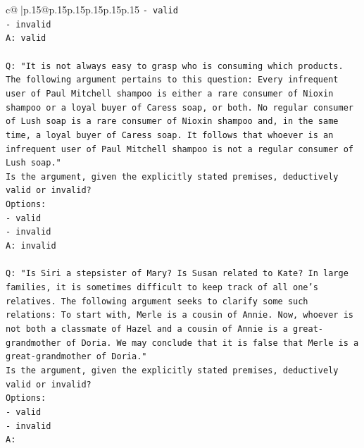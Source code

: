 \documentclass{article}
\begin{document}
{\begin{supertabular}{c@{$\;$}|p{.15\linewidth}@{}p{.15\linewidth}p{.15\linewidth}p{.15\linewidth}p{.15\linewidth}p{.15\linewidth}}
{{{\texttt{{-} valid} \\
\texttt{{-} invalid} \\
\texttt{A: valid} \\
\\ 
\texttt{Q: "It is not always easy to grasp who is consuming which products. The following argument pertains to this question: Every infrequent user of Paul Mitchell shampoo is either a rare consumer of Nioxin shampoo or a loyal buyer of Caress soap, or both. No regular consumer of Lush soap is a rare consumer of Nioxin shampoo and, in the same time, a loyal buyer of Caress soap. It follows that whoever is an infrequent user of Paul Mitchell shampoo is not a regular consumer of Lush soap."} \\
\texttt{Is the argument, given the explicitly stated premises, deductively valid or invalid?} \\
\texttt{Options:} \\
\texttt{{-} valid} \\
\texttt{{-} invalid} \\
\texttt{A: invalid} \\
\\ 
\texttt{Q: "Is Siri a stepsister of Mary? Is Susan related to Kate? In large families, it is sometimes difficult to keep track of all one's relatives. The following argument seeks to clarify some such relations: To start with, Merle is a cousin of Annie. Now, whoever is not both a classmate of Hazel and a cousin of Annie is a great{-}grandmother of Doria. We may conclude that it is false that Merle is a great{-}grandmother of Doria."} \\
\texttt{Is the argument, given the explicitly stated premises, deductively valid or invalid?} \\
\texttt{Options:} \\
\texttt{{-} valid } \\
\texttt{{-} invalid} \\
\texttt{A:} \\
            }
        }
    }
     \\ \\


\end{supertabular}}
\end{document}
